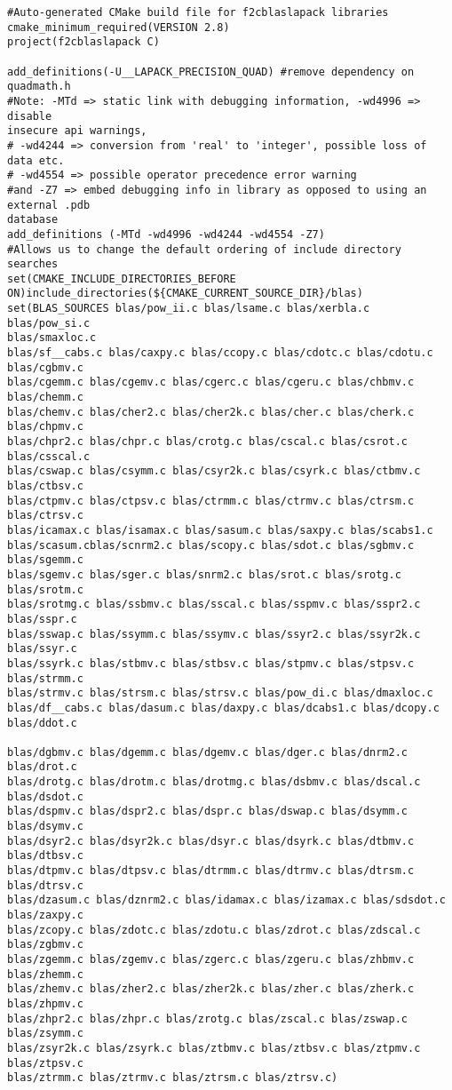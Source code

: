 \documentclass[10pt,a4paper]{article}
\begin{document}
\begin{codeparchment}
\begin{lstlisting}
#Auto-generated CMake build file for f2cblaslapack libraries
cmake_minimum_required(VERSION 2.8)
project(f2cblaslapack C)

add_definitions(-U__LAPACK_PRECISION_QUAD) #remove dependency on quadmath.h
#Note: -MTd => static link with debugging information, -wd4996 => disable
insecure api warnings,
# -wd4244 => conversion from 'real' to 'integer', possible loss of data etc.
# -wd4554 => possible operator precedence error warning
#and -Z7 => embed debugging info in library as opposed to using an external .pdb
database
add_definitions (-MTd -wd4996 -wd4244 -wd4554 -Z7)
#Allows us to change the default ordering of include directory searches
set(CMAKE_INCLUDE_DIRECTORIES_BEFORE
ON)include_directories(${CMAKE_CURRENT_SOURCE_DIR}/blas)
set(BLAS_SOURCES blas/pow_ii.c blas/lsame.c blas/xerbla.c blas/pow_si.c
blas/smaxloc.c
blas/sf__cabs.c blas/caxpy.c blas/ccopy.c blas/cdotc.c blas/cdotu.c blas/cgbmv.c
blas/cgemm.c blas/cgemv.c blas/cgerc.c blas/cgeru.c blas/chbmv.c blas/chemm.c
blas/chemv.c blas/cher2.c blas/cher2k.c blas/cher.c blas/cherk.c blas/chpmv.c
blas/chpr2.c blas/chpr.c blas/crotg.c blas/cscal.c blas/csrot.c blas/csscal.c
blas/cswap.c blas/csymm.c blas/csyr2k.c blas/csyrk.c blas/ctbmv.c blas/ctbsv.c
blas/ctpmv.c blas/ctpsv.c blas/ctrmm.c blas/ctrmv.c blas/ctrsm.c blas/ctrsv.c
blas/icamax.c blas/isamax.c blas/sasum.c blas/saxpy.c blas/scabs1.c
blas/scasum.cblas/scnrm2.c blas/scopy.c blas/sdot.c blas/sgbmv.c blas/sgemm.c
blas/sgemv.c blas/sger.c blas/snrm2.c blas/srot.c blas/srotg.c blas/srotm.c
blas/srotmg.c blas/ssbmv.c blas/sscal.c blas/sspmv.c blas/sspr2.c blas/sspr.c 
blas/sswap.c blas/ssymm.c blas/ssymv.c blas/ssyr2.c blas/ssyr2k.c blas/ssyr.c 
blas/ssyrk.c blas/stbmv.c blas/stbsv.c blas/stpmv.c blas/stpsv.c blas/strmm.c 
blas/strmv.c blas/strsm.c blas/strsv.c blas/pow_di.c blas/dmaxloc.c 
blas/df__cabs.c blas/dasum.c blas/daxpy.c blas/dcabs1.c blas/dcopy.c blas/ddot.c

blas/dgbmv.c blas/dgemm.c blas/dgemv.c blas/dger.c blas/dnrm2.c blas/drot.c 
blas/drotg.c blas/drotm.c blas/drotmg.c blas/dsbmv.c blas/dscal.c blas/dsdot.c 
blas/dspmv.c blas/dspr2.c blas/dspr.c blas/dswap.c blas/dsymm.c blas/dsymv.c 
blas/dsyr2.c blas/dsyr2k.c blas/dsyr.c blas/dsyrk.c blas/dtbmv.c blas/dtbsv.c 
blas/dtpmv.c blas/dtpsv.c blas/dtrmm.c blas/dtrmv.c blas/dtrsm.c blas/dtrsv.c 
blas/dzasum.c blas/dznrm2.c blas/idamax.c blas/izamax.c blas/sdsdot.c
blas/zaxpy.c 
blas/zcopy.c blas/zdotc.c blas/zdotu.c blas/zdrot.c blas/zdscal.c blas/zgbmv.c 
blas/zgemm.c blas/zgemv.c blas/zgerc.c blas/zgeru.c blas/zhbmv.c blas/zhemm.c 
blas/zhemv.c blas/zher2.c blas/zher2k.c blas/zher.c blas/zherk.c blas/zhpmv.c 
blas/zhpr2.c blas/zhpr.c blas/zrotg.c blas/zscal.c blas/zswap.c blas/zsymm.c 
blas/zsyr2k.c blas/zsyrk.c blas/ztbmv.c blas/ztbsv.c blas/ztpmv.c blas/ztpsv.c 
blas/ztrmm.c blas/ztrmv.c blas/ztrsm.c blas/ztrsv.c)



\end{lstlisting}
\end{codeparchment}
\end{document}
